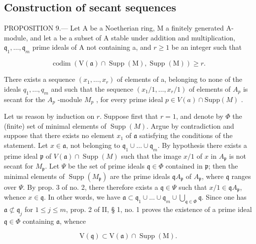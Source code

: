 \subsection{Construction of secant sequences}

PROPOSITION 9.--- Let A be a Noetherian ring, M a finitely generated A-module, and let a be a subset of A stable under addition and multiplication, \(\mathfrak{q}_{1},\ldots,\mathfrak{q}_{m}\) prime ideals of A not containing a, and \(r\geqslant1\) be an integer such that

\[
\operatorname{codim} (\mathrm{V} (\mathfrak {a}) \cap \operatorname{Supp} (\mathrm{M}), \operatorname{Supp} (\mathrm{M})) \geqslant r.\tag{21}
\]

There exists a sequence \((x_{1}, \ldots, x_{r})\) of elements of a, belonging to none of the ideals \(q_{1}, \ldots, q_{m}\) and such that the sequence \((x_{1}/1, \ldots, x_{r}/1)\) of elements of \(A_{p}\) is secant for the \(A_{p}\) -module \(M_{p}\) , for every prime ideal \(p \in V(a) \cap \text{Supp}(M)\) .

Let us reason by induction on \(r\). Suppose first that \(r = 1\), and denote by \(\Phi\) the (finite) set of minimal elements of \(\operatorname{Supp}(M)\). Argue by contradiction and suppose that there exists no element \(x_1\) of \(\mathfrak{a}\) satisfying the conditions of the statement. Let \(x \in \mathfrak{a}\), not belonging to \(\mathfrak{q}_1 \cup \ldots \cup \mathfrak{q}_m\). By hypothesis there exists a prime ideal \(\mathfrak{p}\) of \(V(\mathfrak{a}) \cap \operatorname{Supp}(M)\) such that the image \(x/1\) of \(x\) in \(A_{\mathfrak{p}}\) is not secant for \(M_{\mathfrak{p}}\). Let \(\Psi\) be the set of prime ideals \(\mathfrak{q} \in \Phi\) contained in \(\mathfrak{p}\); then the minimal elements of \(\operatorname{Supp}(M_{\mathfrak{p}})\) are the prime ideals \(\mathfrak{q}A_{\mathfrak{p}}\) of \(A_{\mathfrak{p}}\), where \(\mathfrak{q}\) ranges over \(\Psi\). By prop. 3 of no. 2, there therefore exists a \(\mathfrak{q} \in \Psi\) such that \(x/1 \in \mathfrak{q}A_{\mathfrak{p}}\), whence \(x \in \mathfrak{q}\). In other words, we have \(\mathfrak{a} \subset \mathfrak{q}_1 \cup \ldots \cup \mathfrak{q}_m \cup \bigcup_{\mathfrak{q} \in \Phi} \mathfrak{q}\). Since one has \(\mathfrak{a} \not\subset \mathfrak{q}_j\) for \(1 \leqslant j \leqslant m\), prop. 2 of II, § 1, no. 1 proves the existence of a prime ideal \(\mathfrak{q} \in \Phi\) containing \(\mathfrak{a}\), whence

\[
\mathrm{V} (\mathfrak {q}) \subset \mathrm{V} (\mathfrak {a}) \cap \operatorname{Supp} (\mathrm{M}).
\]


